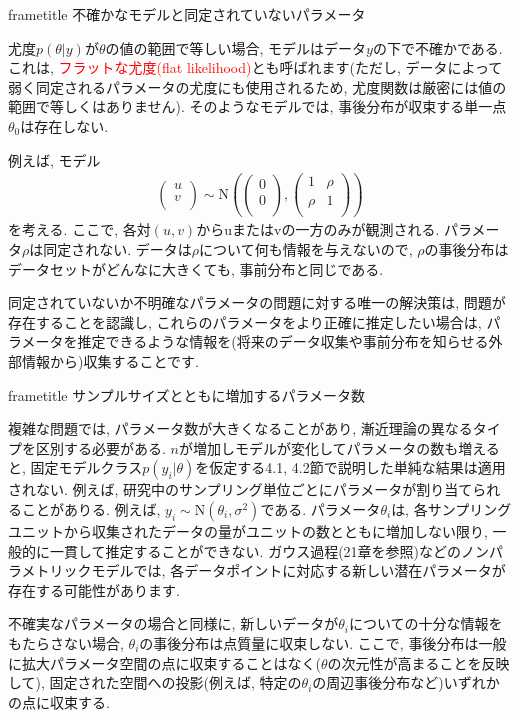 \documentclass[10pt,dvipdfmx,a4]{beamer}
\newcommand{\eqn}[1]{\begin{align*}#1\end{align*}}
\newcommand{\dbox}[1]{\begin{beamercolorbox}[wd=122mm, sep=0pt, shadow=false, rounded=false]{frametitle} { #1}\end{beamercolorbox}}
\newcommand{\tcr}[1]{\textcolor{red}{#1}}
\begin{document}

\begin{frame}
\dbox{不確かなモデルと同定されていないパラメータ}
尤度$p(\theta|y)$が$\theta$の値の範囲で等しい場合, モデルはデータ$y$の下で不確かである.
これは, \tcr{フラットな尤度(flat likelihood)}とも呼ばれます(ただし, データによって弱く同定されるパラメータの尤度にも使用されるため, 尤度関数は厳密には値の範囲で等しくはありません).
そのようなモデルでは, 事後分布が収束する単一点$\theta_0$は存在しない.

例えば, モデル
\eqn{\begin{pmatrix}u\\v\\\end{pmatrix}\sim\text{N}\left(\begin{pmatrix}0\\0\\\end{pmatrix}, \begin{pmatrix}1&\rho \\ \rho&1\\\end{pmatrix}\right)}
を考える.
ここで, 各対$(u, v)$からuまたはvの一方のみが観測される.
パラメータ$\rho$は同定されない.
データは$\rho$について何も情報を与えないので, $\rho$の事後分布はデータセットがどんなに大きくても, 事前分布と同じである.

同定されていないか不明確なパラメータの問題に対する唯一の解決策は, 問題が存在することを認識し, これらのパラメータをより正確に推定したい場合は, パラメータを推定できるような情報を(将来のデータ収集や事前分布を知らせる外部情報から)収集することです.
\end{frame}


\begin{frame}
\dbox{サンプルサイズとともに増加するパラメータ数}
複雑な問題では, パラメータ数が大きくなることがあり, 漸近理論の異なるタイプを区別する必要がある.
$n$が増加しモデルが変化してパラメータの数も増えると, 固定モデルクラス$p(y_i|\theta)$を仮定する4.1, 4.2節で説明した単純な結果は適用されない.
例えば, 研究中のサンプリング単位ごとにパラメータが割り当てられることがありる.
例えば, $y_i\sim \text{N}(\theta_i, \sigma^2)$である.
パラメータ$\theta_i$は, 各サンプリングユニットから収集されたデータの量がユニットの数とともに増加しない限り, 一般的に一貫して推定することができない.
ガウス過程(21章を参照)などのノンパラメトリックモデルでは, 各データポイントに対応する新しい潜在パラメータが存在する可能性があります.

不確実なパラメータの場合と同様に, 新しいデータが$\theta_i$についての十分な情報をもたらさない場合, $\theta_i$の事後分布は点質量に収束しない.
ここで, 事後分布は一般に拡大パラメータ空間の点に収束することはなく($\theta$の次元性が高まることを反映して), 固定された空間への投影(例えば, 特定の$\theta_i$の周辺事後分布など)いずれかの点に収束する.
\end{frame}
\end{document}
